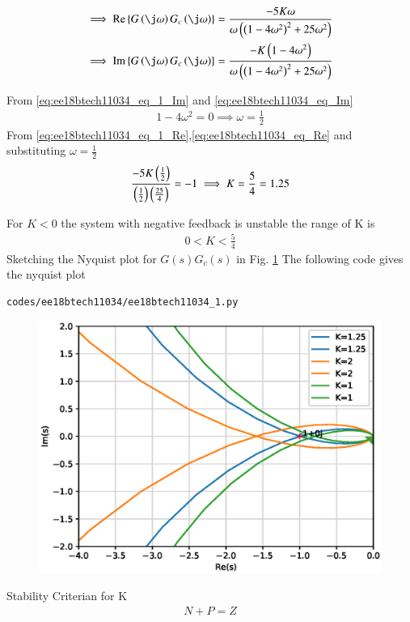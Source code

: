 \begin{align}
 \implies    \text{Re} \cbrak{G\brak{\j \omega}G_{c}\brak{\j\omega}} &= \frac{-5K\omega}{{\omega}\brak{\brak{1-4\omega^2}^2+25\omega^2}}
 \label{eq:ee18btech11034_eq_1_Re}
 \\
 \implies \text{Im} \cbrak{G\brak{\j \omega}G_{c}\brak{\j\omega}} &= \frac{-K\brak{1-4\omega^2}}{{\omega}\brak{\brak{1-4\omega^2}^2+25\omega^2}}
 \label{eq:ee18btech11034_eq_1_Im}
\end{align}

From \eqref{eq:ee18btech11034_eq_1_Im} and \eqref{eq:ee18btech11034_eq_Im}
\begin{align}
    1-4\omega^2 = 0
    \implies \omega = \frac{1}{2} 
\end{align}
From  \eqref{eq:ee18btech11034_eq_1_Re},\eqref{eq:ee18btech11034_eq_Re} and substituting $\omega = \frac{1}{2}$
\begin{align}
    \frac{-5K\left(\frac{1}{2}\right)}{\left(\frac{1}{2}\right)\left(\frac{25}{4}\right)} = -1
    \implies K = \frac{5}{4} = 1.25
\end{align}

For $K < 0$ the system with negative feedback is unstable the range of K is 
\begin{align}
    0 < K < \frac{5}{4}
\end{align}
 Sketching the Nyquist plot for $G(s)G_c(s)$ in Fig. \ref{fig:ee18btech11034_1}
The following code gives the nyquist plot
\begin{lstlisting}
codes/ee18btech11034/ee18btech11034_1.py
\end{lstlisting}

\begin{figure}[!h]
\centering
\includegraphics[width=\columnwidth]{./figs/ee18btech11034/ee18btech11034_1.eps}
\caption{}
\label{fig:ee18btech11034_1}
\end{figure}
 Stability Criterian for K
\begin{align}
    N + P = Z
    \label{eq:ee18btech11034_Z}
\end{align}
\begin{table}[!ht]
\centering

\caption{}
\label{table:ee18btech11034_table1}
\end{table}

